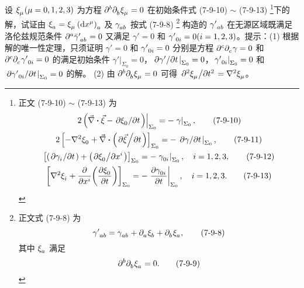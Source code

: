\begin{xiti}
	\item 设 $\tensor{\xi}{_\mu}(\mu=0,1,2,3)$ 为方程 $\tensor{\partial}{^b} \tensor{\partial}{_b} \tensor{\xi}{_\mu} = 0$ 在初始条件式 (7-9-10) $\sim$ (7-9-13) \footnote{正文 (7-9-10) $\sim$ (7-9-13) 为
	\begin{gather}
		\left. 2 \left( \myvec{\nabla} \vdot \myvec{\xi} - \pdv*{\tensor{\xi}{_0}}{t} \right) \right|_{\Sigma_0} = - \left. \gamma \right|_{\Sigma_0}, \tag{7-9-10}\\
		2 \left[ - \nabla^2 \tensor{\xi}{_0} + \myvec{\nabla} \vdot \left( \pdv*{\myvec{\xi}}{t} \right) \right]_{\Sigma_0} = - \left. \pdv*{\gamma}{t} \right|_{\Sigma_0}, \tag{7-9-11}\\
		\left[ \left( \pdv*{\tensor{\gamma}{_i}}{t} \right) + \left( \pdv*{\tensor{\xi}{_0}}{x^i} \right) \right]_{\Sigma_0} = - \left. \tensor{\gamma}{_0_i} \right|_{\Sigma_0} \qc i = 1,2,3, \tag{7-9-12}\\
		\left[ \nabla^2 \tensor{\xi}{_i} + \pdv{x^i}(\pdv{\tensor{\xi}{_0}}{t}) \right]_{\Sigma_0} = - \left. \pdv{\tensor{\gamma}{_0_i}}{t} \right|_{\Sigma_0} \qc i=1,2,3. \tag{7-9-13}
	\end{gather}}下的解，试证由 $\tensor{\xi}{_a} = \tensor{\xi}{_\mu} \tensor{\left( \dd{x^\mu} \right)}{_a}$ 及 $\tensor{\gamma}{_a_b}$ 按式 (7-9-8) \footnote{正文式 (7-9-8) 为
	\begin{equation}
		\tensor{{\gamma'}}{_a_b} = \tensor{\gamma}{_a_b} + \Partial{a} \tensor{\xi}{_b} + \Partial{b} \tensor{\xi}{_a}, \tag{7-9-8}
	\end{equation}
	其中 $\tensor{\xi}{_a}$ 满足
	\begin{equation}
		\tensor{\partial}{^b} \Partial{b} \tensor{\xi}{_a} = 0. \tag{7-9-9}
	\end{equation}} 构造的 $\tensor{{\gamma'}}{_a_b}$ 在无源区域既满足洛伦兹规范条件 $\tensor{\partial}{^a} \tensor{{{\bar{\gamma}}}}{^\prime_a_b} = 0$ 又满足 $\gamma'=0$ 和 $\tensor{{\gamma'}}{_0_i} = 0(i=1,2,3)$。提示：(1) 根据解的唯一性定理，只须证明 $\gamma'=0$ 和 $\tensor{{\gamma'}}{_0_i}=0$ 分别是方程 $\tensor{\partial}{^c} \tensor{\partial}{_c} \gamma = 0$ 和 $\tensor{\partial}{^c} \tensor{\partial}{_c} \tensor{{\gamma'}}{_0_i} = 0$ 的满足初始条件 $\left. \gamma' \right|_{\Sigma_0} = 0$，$\left. \pdv*{\gamma'}{t} \right|_{\Sigma_0} = 0$，$\left. \tensor{{\gamma'}}{_0_i} \right|_{\Sigma_0} = 0$ 和 $\left. \pdv*{\tensor{{\gamma'}}{_0_i}}{t} \right|_{\Sigma_0} = 0$ 的解。 (2) 由 $\tensor{\partial}{^b} \tensor{\partial}{_b} \tensor{\xi}{_\mu} = 0$ 可得 $\pdv*[2]{\tensor{\xi}{_\mu}}{t} = \nabla^2 \tensor{\xi}{_\mu}$。


\end{xiti}
